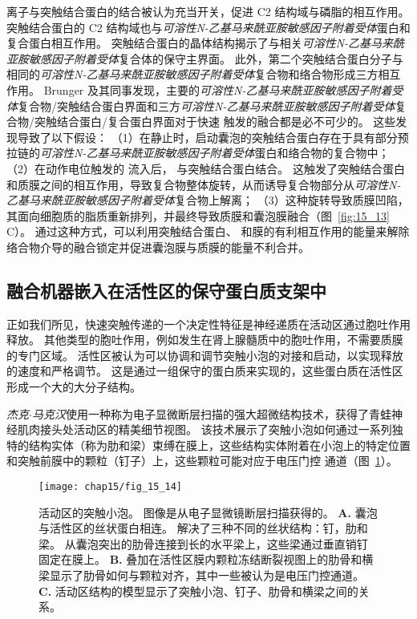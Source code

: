  离子与突触结合蛋白的结合被认为充当开关，促进 C2 结构域与磷脂的相互作用。
突触结合蛋白的 C2 结构域也与\textit{可溶性N-乙基马来酰亚胺敏感因子附着受体}蛋白和复合蛋白相互作用。
突触结合蛋白的晶体结构揭示了与相关\textit{可溶性N-乙基马来酰亚胺敏感因子附着受体}复合体的保守主界面。
此外，第二个突触结合蛋白分子与相同的\textit{可溶性N-乙基马来酰亚胺敏感因子附着受体}复合物和络合物形成三方相互作用。
Brunger 及其同事发现，主要的\textit{可溶性N-乙基马来酰亚胺敏感因子附着受体}复合物/突触结合蛋白界面和三方\textit{可溶性N-乙基马来酰亚胺敏感因子附着受体}复合物/突触结合蛋白/复合蛋白界面对于快速  触发的融合都是必不可少的。
这些发现导致了以下假设：
（1）在静止时，启动囊泡的突触结合蛋白存在于具有部分预拉链的\textit{可溶性N-乙基马来酰亚胺敏感因子附着受体}蛋白和络合物的复合物中；
（2）在动作电位触发的  流入后， 与突触结合蛋白结合。
这触发了突触结合蛋白和质膜之间的相互作用，导致复合物整体旋转，从而诱导复合物部分从\textit{可溶性N-乙基马来酰亚胺敏感因子附着受体}复合物上解离；
（3）这种旋转导致质膜凹陷，其面向细胞质的脂质重新排列，并最终导致质膜和囊泡膜融合（图~\ref{fig:15_13} C）。
通过这种方式，可以利用突触结合蛋白、 和膜的有利相互作用的能量来解除络合物介导的融合锁定并促进囊泡膜与质膜的能量不利合并。



\subsection{融合机器嵌入在活性区的保守蛋白质支架中}

正如我们所见，快速突触传递的一个决定性特征是神经递质在活动区通过胞吐作用释放。
其他类型的胞吐作用，例如发生在肾上腺髓质中的胞吐作用，不需要质膜的专门区域。
活性区被认为可以协调和调节突触小泡的对接和启动，以实现释放的速度和严格调节。
这是通过一组保守的蛋白质来实现的，这些蛋白质在活性区形成一个大的大分子结构。


\textit{杰克$\cdot$马克汉}使用一种称为电子显微断层扫描的强大超微结构技术，获得了青蛙神经肌肉接头处活动区的精美细节视图。
该技术展示了突触小泡如何通过一系列独特的结构实体（称为肋和梁）束缚在膜上，这些结构实体附着在小泡上的特定位置和突触前膜中的颗粒（钉子）上，这些颗粒可能对应于电压门控  通道（图~\ref{fig:15_14}）。


\begin{figure}[htbp]
	\centering
	\texttt{[image: chap15/fig\_15\_14]}
	\caption{活动区的突触小泡。
		图像是从电子显微镜断层扫描获得的\cite{harlow2001architecture}。
		\textbf{A.} 囊泡与活性区的丝状蛋白相连。
		解决了三种不同的丝状结构：钉，肋和梁。
		从囊泡突出的肋骨连接到长的水平梁上，这些梁通过垂直销钉固定在膜上。
		\textbf{B.} 叠加在活性区膜内颗粒冻结断裂视图上的肋骨和横梁显示了肋骨如何与颗粒对齐，其中一些被认为是电压门控通道。
		\textbf{C.} 活动区结构的模型显示了突触小泡、钉子、肋骨和横梁之间的关系。}
	\label{fig:15_14}
\end{figure}


